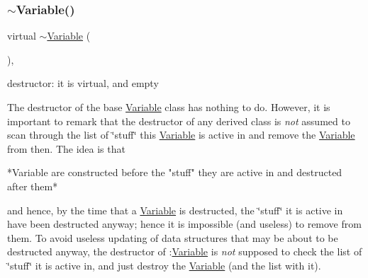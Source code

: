 \subsubsection{\texorpdfstring{$\sim$\+Variable()}{~Variable()}}
{\footnotesize\ttfamily virtual $\sim$\mbox{\hyperlink{class_s_m_spp__di__unipi__it_1_1_variable}{Variable}} (\begin{DoxyParamCaption}{ }\end{DoxyParamCaption})\hspace{0.3cm}{\ttfamily [inline]}, {\ttfamily [virtual]}}



destructor\+: it is virtual, and empty 

The destructor of the base \mbox{\hyperlink{class_s_m_spp__di__unipi__it_1_1_variable}{Variable}} class has nothing to do. However, it is important to remark that the destructor of any derived class is {\itshape not} assumed to scan through the list of \char`\"{}stuff\char`\"{} this \mbox{\hyperlink{class_s_m_spp__di__unipi__it_1_1_variable}{Variable}} is active in and remove the \mbox{\hyperlink{class_s_m_spp__di__unipi__it_1_1_variable}{Variable}} from then. The idea is that \begin{DoxyVerb}*Variable are constructed before the "stuff" they are active
 in and destructed after them*
\end{DoxyVerb}


and hence, by the time that a \mbox{\hyperlink{class_s_m_spp__di__unipi__it_1_1_variable}{Variable}} is destructed, the \char`\"{}stuff\char`\"{} it is active in have been destructed anyway; hence it is impossible (and useless) to remove from them. To avoid useless updating of data structures that may be about to be destructed anyway, the destructor of \+:\mbox{\hyperlink{class_s_m_spp__di__unipi__it_1_1_variable}{Variable}} is {\itshape not} supposed to check the list of \char`\"{}stuff\char`\"{} it is active in, and just destroy the \mbox{\hyperlink{class_s_m_spp__di__unipi__it_1_1_variable}{Variable}} (and the list with it).

